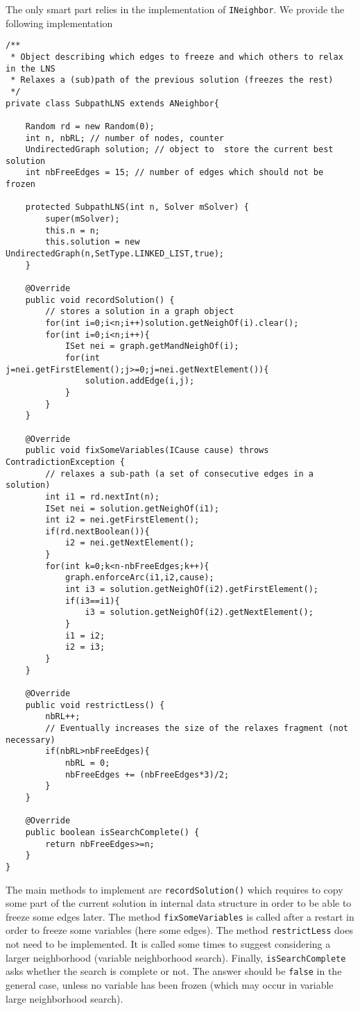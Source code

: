 \documentclass{article}
\begin{document}
The only smart part relies in the implementation of \texttt{INeighbor}. We provide the following implementation
\begin{lstlisting}
/**
 * Object describing which edges to freeze and which others to relax in the LNS
 * Relaxes a (sub)path of the previous solution (freezes the rest)
 */
private class SubpathLNS extends ANeighbor{

	Random rd = new Random(0);
	int n, nbRL; // number of nodes, counter 
	UndirectedGraph solution; // object to  store the current best solution
	int nbFreeEdges = 15; // number of edges which should not be frozen

	protected SubpathLNS(int n, Solver mSolver) {
		super(mSolver);
		this.n = n;
		this.solution = new UndirectedGraph(n,SetType.LINKED_LIST,true);
	}

	@Override
	public void recordSolution() {
		// stores a solution in a graph object
		for(int i=0;i<n;i++)solution.getNeighOf(i).clear();
		for(int i=0;i<n;i++){
			ISet nei = graph.getMandNeighOf(i);
			for(int j=nei.getFirstElement();j>=0;j=nei.getNextElement()){
				solution.addEdge(i,j);
			}
		}
	}

	@Override
	public void fixSomeVariables(ICause cause) throws ContradictionException {
		// relaxes a sub-path (a set of consecutive edges in a solution)
		int i1 = rd.nextInt(n);
		ISet nei = solution.getNeighOf(i1);
		int i2 = nei.getFirstElement();
		if(rd.nextBoolean()){
			i2 = nei.getNextElement();
		}
		for(int k=0;k<n-nbFreeEdges;k++){
			graph.enforceArc(i1,i2,cause);
			int i3 = solution.getNeighOf(i2).getFirstElement();
			if(i3==i1){
				i3 = solution.getNeighOf(i2).getNextElement();
			}
			i1 = i2;
			i2 = i3;
		}
	}

	@Override
	public void restrictLess() {
		nbRL++;
		// Eventually increases the size of the relaxes fragment (not necessary)
		if(nbRL>nbFreeEdges){
			nbRL = 0;
			nbFreeEdges += (nbFreeEdges*3)/2;
		}
	}

	@Override
	public boolean isSearchComplete() {
		return nbFreeEdges>=n;
	}
}
\end{lstlisting}

The main methods to implement are \texttt{recordSolution()} which requires to copy some part of the current solution in internal data structure in order to be able to freeze some edges later. 
The method \texttt{fixSomeVariables} is called after a restart in order to freeze some variables (here some edges). The method \texttt{restrictLess} does not need to be implemented. It is called some times to suggest considering a larger neighborhood (variable neighborhood search). Finally, \texttt{isSearchComplete} asks whether the search is complete or not. The answer should be \texttt{false} in the general case, unless no variable has been frozen (which may occur in variable large neighborhood search). 
\end{document}
